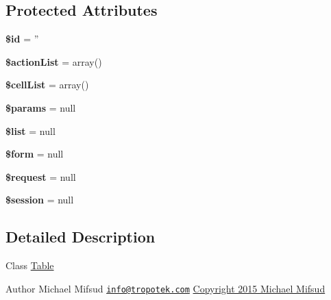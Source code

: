 \subsection*{Protected Attributes}
\begin{DoxyCompactItemize}
\item 
\hypertarget{classTk_1_1Table_a7383313ef39cfdea864468fd1ac392a1}{{\bfseries \$id} = ''}\label{classTk_1_1Table_a7383313ef39cfdea864468fd1ac392a1}

\item 
\hypertarget{classTk_1_1Table_af7f9c589f1dd77061fd352b1e2a76e0e}{{\bfseries \$action\+List} = array()}\label{classTk_1_1Table_af7f9c589f1dd77061fd352b1e2a76e0e}

\item 
\hypertarget{classTk_1_1Table_a77bde1389708b23ccdbd6a75745e126a}{{\bfseries \$cell\+List} = array()}\label{classTk_1_1Table_a77bde1389708b23ccdbd6a75745e126a}

\item 
\hypertarget{classTk_1_1Table_ace72f0aeff7ddb9c244b477278b2ec03}{{\bfseries \$params} = null}\label{classTk_1_1Table_ace72f0aeff7ddb9c244b477278b2ec03}

\item 
\hypertarget{classTk_1_1Table_a24665cb0dd2e16c22c58214a53d4a2ac}{{\bfseries \$list} = null}\label{classTk_1_1Table_a24665cb0dd2e16c22c58214a53d4a2ac}

\item 
\hypertarget{classTk_1_1Table_ab1bebb68ad3aef3d9a5b456ee227a158}{{\bfseries \$form} = null}\label{classTk_1_1Table_ab1bebb68ad3aef3d9a5b456ee227a158}

\item 
\hypertarget{classTk_1_1Table_a76af993b67b06854a52f43a8a59b0e55}{{\bfseries \$request} = null}\label{classTk_1_1Table_a76af993b67b06854a52f43a8a59b0e55}

\item 
\hypertarget{classTk_1_1Table_a55b9b4e88f552006f3dc29de64fdd0fd}{{\bfseries \$session} = null}\label{classTk_1_1Table_a55b9b4e88f552006f3dc29de64fdd0fd}

\end{DoxyCompactItemize}


\subsection{Detailed Description}
Class \hyperlink{classTk_1_1Table}{Table}

\begin{DoxyAuthor}{Author}
Michael Mifsud \href{mailto:info@tropotek.com}{\tt info@tropotek.\+com} \hyperlink{}{Copyright 2015 Michael Mifsud }
\end{DoxyAuthor}


